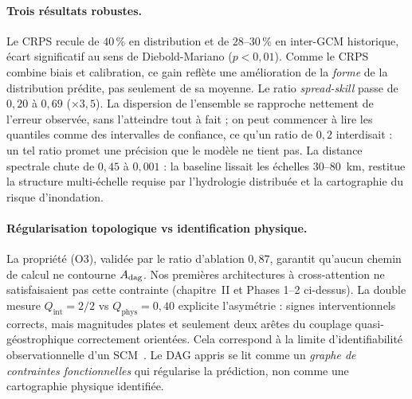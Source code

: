 \label{sec:exp-discussion}

\paragraph{Trois résultats robustes.} Le CRPS recule de $40\,\%$ en distribution et de $28$--$30\,\%$ en inter-GCM historique, écart significatif au sens de Diebold-Mariano ($p<0{,}01$). Comme le CRPS combine biais et calibration, ce gain reflète une amélioration de la \emph{forme} de la distribution prédite, pas seulement de sa moyenne. Le ratio \emph{spread-skill} passe de $0{,}20$ à $0{,}69$ ($\times 3{,}5$). La dispersion de l'ensemble \Oracle{} se rapproche nettement de l'erreur observée, sans l'atteindre tout à fait ; on peut commencer à lire les quantiles comme des intervalles de confiance, ce qu'un ratio de $0{,}2$ interdisait : un tel ratio promet une précision que le modèle ne tient pas. La distance spectrale chute de $0{,}45$ à $0{,}001$ : la baseline lissait les échelles $30$--$80$~km, \Oracle{} restitue la structure multi-échelle requise par l'hydrologie distribuée et la cartographie du risque d'inondation.

\paragraph{Régularisation topologique vs identification physique.} La propriété (O3), validée par le ratio d'ablation $0{,}87$, garantit qu'aucun chemin de calcul ne contourne $A_{\mathrm{dag}}$. Nos premières architectures à cross-attention ne satisfaisaient pas cette contrainte (chapitre~II et Phases 1--2 ci-dessus). La double mesure $Q_{\mathrm{int}}=2/2$ vs $Q_{\mathrm{phys}}=0{,}40$ explicite l'asymétrie : signes interventionnels corrects, mais magnitudes plates et seulement deux arêtes du couplage quasi-géostrophique correctement orientées. Cela correspond à la limite d'identifiabilité observationnelle d'un SCM~\cite{pearl_causality_2009}. Le DAG appris se lit comme un \emph{graphe de contraintes fonctionnelles} qui régularise la prédiction, non comme une cartographie physique identifiée.

